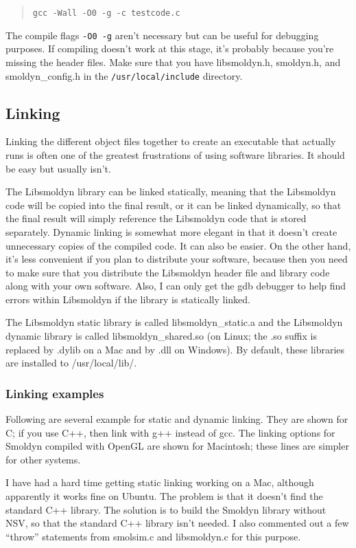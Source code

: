 \documentclass {book}
\newcommand {\ttt} {\texttt}
\begin{document}
\begin{quote}
\lstinline{gcc -Wall -O0 -g -c testcode.c}
\end{quote}

The compile flags \ttt{-O0 -g} aren't necessary but can be useful for debugging purposes. If compiling doesn't work at this stage, it's probably because you're missing the header files. Make sure that you have libsmoldyn.h, smoldyn.h, and smoldyn\_config.h in the \ttt{/usr/local/include} directory.

\subsection*{Linking}

Linking the different object files together to create an executable that actually runs is often one of the greatest frustrations of using software libraries. It should be easy but usually isn't.

The Libsmoldyn library can be linked statically, meaning that the Libsmoldyn code will be copied into the final result, or it can be linked dynamically, so that the final result will simply reference the Libsmoldyn code that is stored separately. Dynamic linking is somewhat more elegant in that it doesn't create unnecessary copies of the compiled code. It can also be easier. On the other hand, it's less convenient if you plan to distribute your software, because then you need to make sure that you distribute the Libsmoldyn header file and library code along with your own software. Also, I can only get the gdb debugger to help find errors within Libsmoldyn if the library is statically linked.

The Libsmoldyn static library is called libsmoldyn\_static.a and the Libsmoldyn dynamic library is called libsmoldyn\_shared.so (on Linux; the .so suffix is replaced by .dylib on a Mac and by .dll on Windows). By default, these libraries are installed to /usr/local/lib/.

\subsubsection*{Linking examples}

Following are several example for static and dynamic linking. They are shown for C; if you use C++, then link with g++ instead of gcc. The linking options for Smoldyn compiled with OpenGL are shown for Macintosh; these lines are simpler for other systems.

I have had a hard time getting static linking working on a Mac, although apparently it works fine on Ubuntu. The problem is that it doesn't find the standard C++ library. The solution is to build the Smoldyn library without NSV, so that the standard C++ library isn't needed. I also commented out a few ``throw'' statements from smolsim.c and libsmoldyn.c for this purpose.
\end{document}
